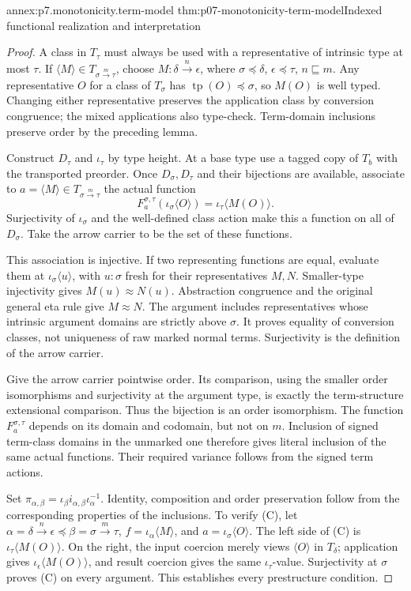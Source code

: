 \begin{annexitem}{annex:p7.monotonicity.term-model}
 {thm:p07-monotonicity-term-model}{Indexed functional realization and interpretation}
\begin{proof}
A class in \(T_\tau\) must always be used with a representative of intrinsic
type at most \(\tau\). If
\(\langle M\rangle\in T_{\sigma\xrightarrow m\tau}\), choose
\(M:\delta\xrightarrow n\epsilon\), where
\(\sigma\preceq\delta\), \(\epsilon\preceq\tau\), \(n\sqsubseteq m\).
Any representative \(O\) for a class of \(T_\sigma\) has
\(\operatorname{tp}(O)\preceq\sigma\), so \(M(O)\) is well typed.
Changing either representative preserves the application class by
conversion congruence; the mixed applications also type-check.
Term-domain inclusions preserve order by the preceding lemma.

Construct \(D_\tau\) and \(\iota_\tau\) by type height.
At a base type use a tagged copy of \(T_b\) with the transported preorder.
Once \(D_\sigma,D_\tau\) and their bijections are available, associate
to \(a=\langle M\rangle\in T_{\sigma\xrightarrow m\tau}\) the actual
function
\[
 F_a^{\sigma,\tau}(\iota_\sigma\langle O\rangle)
     =\iota_\tau\langle M(O)\rangle.
\]
Surjectivity of \(\iota_\sigma\) and the well-defined class action make
this a function on all of \(D_\sigma\).
Take the arrow carrier to be the set of these functions.

This association is injective. If two representing functions are equal,
evaluate them at \(\iota_\sigma\langle u\rangle\), with \(u:\sigma\)
fresh for their representatives \(M,N\).
Smaller-type injectivity gives \(M(u)\approx N(u)\).
Abstraction congruence and the original general eta rule give
\(M\approx N\). The argument includes representatives whose intrinsic
argument domains are strictly above \(\sigma\).
It proves equality of conversion classes, not uniqueness of raw marked
normal terms. Surjectivity is the definition of the arrow carrier.

Give the arrow carrier pointwise order.
Its comparison, using the smaller order isomorphisms and surjectivity at
the argument type, is exactly the term-structure extensional comparison.
Thus the bijection is an order isomorphism.
The function \(F_a^{\sigma,\tau}\) depends on its domain and codomain,
but not on \(m\). Inclusion of signed term-class domains in the unmarked
one therefore gives literal inclusion of the same actual functions.
Their required variance follows from the signed term actions.

Set \(\pi_{\alpha,\beta}=\iota_\beta i_{\alpha,\beta}\iota_\alpha^{-1}\).
Identity, composition and order preservation follow from the corresponding
properties of the inclusions. To verify (C), let
\(\alpha=\delta\xrightarrow n\epsilon\preceq
 \beta=\sigma\xrightarrow m\tau\),
\(f=\iota_\alpha\langle M\rangle\), and
\(a=\iota_\sigma\langle O\rangle\).
The left side of (C) is
\(\iota_\tau\langle M(O)\rangle\).
On the right, the input coercion merely views \(\langle O\rangle\)
in \(T_\delta\); application gives
\(\iota_\epsilon\langle M(O)\rangle\), and result coercion gives
the same \(\iota_\tau\)-value. Surjectivity at \(\sigma\) proves (C)
on every argument. This establishes every prestructure condition.


\end{proof}
\end{annexitem}
